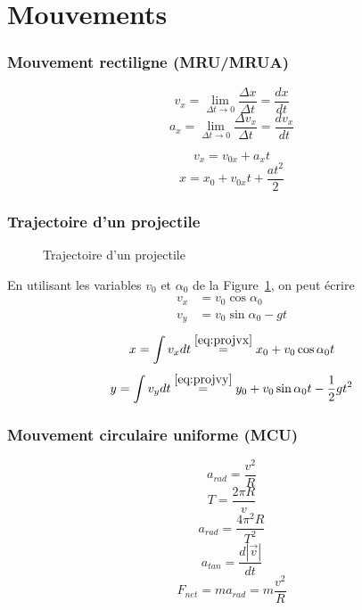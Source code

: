 \part{Mouvements}
\section{Mouvement rectiligne (MRU/MRUA)}
\[ v_x = \lim_{\Delta t \to 0} \frac{\Delta x}{\Delta t} = \frac{dx}{dt} \]
\[ a_x = \lim_{\Delta t \to 0} \frac{\Delta v_x}{\Delta t} = \frac{dv_x}{dt} \]

\[ v_x = v_{0x} + a_{x}t \]
\[ x = x_0 + v_{0x} t + \frac{a t^2}{2} \]

\section{Trajectoire d'un projectile}

\begin{figure}
  \begin{center}
  \end{center}
  \caption{Trajectoire d'un projectile}
  \label{fig:proj}
\end{figure}
En utilisant les variables $v_0$ et $\alpha_0$
de la Figure~\ref{fig:proj}, on peut écrire
\begin{align}\label{eq:projvx}
  v_x & = v_0 \cos{ \alpha_0 }\\
  v_y & = v_0 \sin{ \alpha_0 } - gt \label{eq:projvy}
\end{align}
\[ x = \int v_x dt \stackrel{\eqref{eq:projvx}}{=}
x_0 + v_0 \cos{ \alpha_0 } t \]
\[ y = \int v_y dt \stackrel{\eqref{eq:projvy}}{=}
y_0 + v_0 \sin{ \alpha_0 } t - \frac{1}{2} g t^2 \]

\section{Mouvement circulaire uniforme (MCU)}
\[ a_{rad} = \frac{v^2}{R} \]
\[ T = \frac{2\pi R}{v} \]
\[ a_{rad} = \frac{4\pi^2 R}{T^2} \]
\[ a_{tan} = \frac{ d|\vec{v}| }{ dt } \]
\[ F_{net} = ma_{rad} = m\frac{v^2}{R} \]

